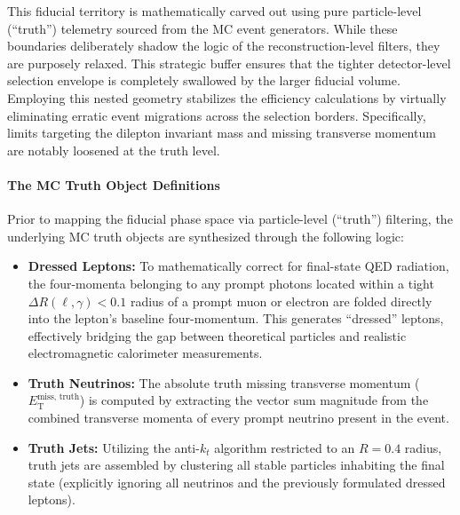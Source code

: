 This fiducial territory is mathematically carved out using pure particle-level (``truth'') telemetry sourced from the MC event generators. While these boundaries deliberately shadow the logic of the reconstruction-level filters, they are purposely relaxed. This strategic buffer ensures that the tighter detector-level selection envelope is completely swallowed by the larger fiducial volume. Employing this nested geometry stabilizes the efficiency calculations by virtually eliminating erratic event migrations across the selection borders. Specifically, limits targeting the dilepton invariant mass and missing transverse momentum are notably loosened at the truth level.

\paragraph{\textbf{The MC Truth Object Definitions}}
Prior to mapping the fiducial phase space via particle-level (``truth'') filtering, the underlying MC truth objects are synthesized through the following logic:
\begin{itemize}
    \item \textbf{Dressed Leptons:} To mathematically correct for final-state QED radiation, the four-momenta belonging to any prompt photons located within a tight $\Delta R(\ell, \gamma) < 0.1$ radius of a prompt muon or electron are folded directly into the lepton's baseline four-momentum. This generates ``dressed'' leptons, effectively bridging the gap between theoretical particles and realistic electromagnetic calorimeter measurements.
    \item \textbf{Truth Neutrinos:} The absolute truth missing transverse momentum ($E_{\text{T}}^{\text{miss, truth}}$) is computed by extracting the vector sum magnitude from the combined transverse momenta of every prompt neutrino present in the event.
    \item \textbf{Truth Jets:} Utilizing the anti-$k_t$ algorithm restricted to an $R=0.4$ radius, truth jets are assembled by clustering all stable particles inhabiting the final state (explicitly ignoring all neutrinos and the previously formulated dressed leptons).
\end{itemize}

